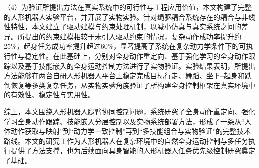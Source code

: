 \begin{cabstract}
（4）为验证所提出方法在真实系统中的可行性与工程应用价值，本文构建了完整的人形机器人实验平台，并开展了实物实验。针对绳驱耦合系统存在的耦合与非线性特性，本文建立了驱动建模与约束处理机制，以减小仿真与真实系统之间的差异。所提出的约束建模相较于未引入驱动约束的情况，复杂动作成功率提升约25\%，起身任务成功率提升超过60\%，显著提高了系统在复杂动力学条件下的可执行性与稳定性。在此基础上，分别对全身动作重定向、基于强化学习的全身动作跟踪以及基于技能嵌入的全身运动控制方法进行了实物验证。实验结果表明，所提出方法能够在两台自研人形机器人平台上稳定完成目标行走、舞蹈、坐下--起身和跌倒恢复等多类复杂任务，从实物实验角度验证了所构建全身控制框架在真实环境中的有效性、稳定性与实用性。

综上，本文围绕人形机器人腿臂协同控制问题，系统研究了全身动作重定向、强化学习全身动作跟踪、技能嵌入分层控制以及实物系统部署方法，形成了一条从“人体动作获取与映射”到“动力学一致控制”再到“多技能组合与实物验证”的完整技术路线。本文的研究工作为人形机器人在复杂环境中的自然全身运动控制与多任务执行提供了方法支撑，也为后续面向具身智能的人形机器人任务优先级控制研究奠定了基础。


\end{cabstract}




